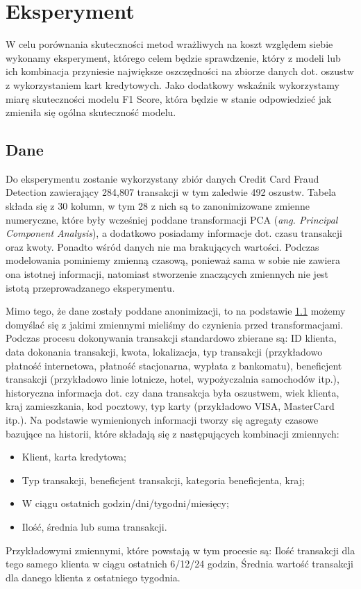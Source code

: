 \documentclass{book}
\begin{document}
\chapter{Eksperyment}
	W celu porównania skuteczności metod wrażliwych na koszt względem siebie wykonamy eksperyment, którego celem będzie sprawdzenie, który z modeli lub ich kombinacja przyniesie największe oszczędności na zbiorze danych dot. oszustw z wykorzystaniem kart kredytowych. Jako dodatkowy wskaźnik wykorzystamy miarę skuteczności modelu F1 Score, która będzie w stanie odpowiedzieć jak zmieniła się ogólna skuteczność modelu.

\section{Dane}
	Do eksperymentu zostanie wykorzystany zbiór danych Credit Card Fraud Detection zawierający 284,807 transakcji w tym zaledwie 492 oszustw. Tabela składa się z 30 kolumn, w tym 28 z nich są to zanonimizowane zmienne numeryczne, które były wcześniej poddane transformacji PCA (\textit{ang. Principal Component Analysis}), a dodatkowo posiadamy informacje dot. czasu transakcji oraz kwoty. Ponadto wśród danych nie ma brakujących wartości. Podczas modelowania pominiemy zmienną czasową, ponieważ sama w sobie nie zawiera ona istotnej informacji, natomiast stworzenie znaczących zmiennych nie jest istotą przeprowadzanego eksperymentu. 
	
	Mimo tego, że dane zostały poddane anonimizacji, to na podstawie \ref{} możemy domyślać się z jakimi zmiennymi mieliśmy do czynienia przed transformacjami. Podczas procesu dokonywania transakcji standardowo zbierane są: ID klienta, data dokonania transakcji, kwota, lokalizacja, typ transakcji (przykładowo płatność internetowa, płatność stacjonarna, wypłata z bankomatu), beneficjent transakcji (przykładowo linie lotnicze, hotel, wypożyczalnia samochodów itp.), historyczna informacja dot. czy dana transakcja była oszustwem, wiek klienta, kraj zamieszkania, kod pocztowy, typ karty (przykładowo VISA, MasterCard itp.). Na podstawie wymienionych informacji tworzy się agregaty czasowe bazujące na historii, które składają się z następujących kombinacji zmiennych:
	\begin{itemize}
		\item Klient, karta kredytowa;
		\item Typ transakcji, beneficjent transakcji, kategoria beneficjenta, kraj;
		\item W ciągu ostatnich godzin/dni/tygodni/miesięcy;
		\item Ilość, średnia lub suma transakcji.
	\end{itemize}
	Przykładowymi zmiennymi, które powstają w tym procesie są: Ilość transakcji dla tego samego klienta w ciągu ostatnich 6/12/24 godzin, Średnia wartość transakcji dla danego klienta z ostatniego tygodnia. 
	
\end{document}

